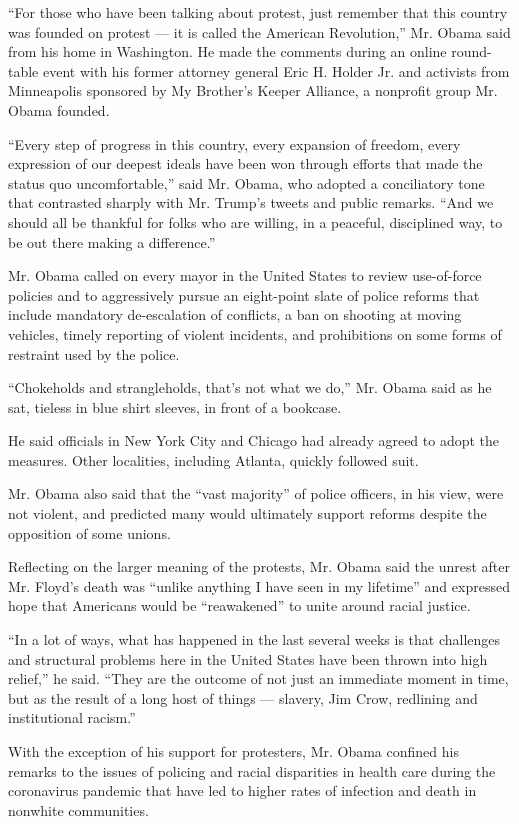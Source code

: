 ``For those who have been talking about protest, just remember that this
country was founded on protest --- it is called the American
Revolution,'' Mr. Obama said from his home in Washington. He made the
comments during an online round-table event with his former attorney
general Eric H. Holder Jr. and activists from Minneapolis sponsored by
My Brother's Keeper Alliance, a nonprofit group Mr. Obama founded.

``Every step of progress in this country, every expansion of freedom,
every expression of our deepest ideals have been won through efforts
that made the status quo uncomfortable,'' said Mr. Obama, who adopted a
conciliatory tone that contrasted sharply with Mr. Trump's tweets and
public remarks. ``And we should all be thankful for folks who are
willing, in a peaceful, disciplined way, to be out there making a
difference.''

Mr. Obama called on every mayor in the United States to review
use-of-force policies and to aggressively pursue an eight-point slate of
police reforms that include mandatory de-escalation of conflicts, a ban
on shooting at moving vehicles, timely reporting of violent incidents,
and prohibitions on some forms of restraint used by the police.

``Chokeholds and strangleholds, that's not what we do,'' Mr. Obama said
as he sat, tieless in blue shirt sleeves, in front of a bookcase.

He said officials in New York City and Chicago had already agreed to
adopt the measures. Other localities, including Atlanta, quickly
followed suit.

Mr. Obama also said that the ``vast majority'' of police officers, in
his view, were not violent, and predicted many would ultimately support
reforms despite the opposition of some unions.

Reflecting on the larger meaning of the protests, Mr. Obama said the
unrest after Mr. Floyd's death was ``unlike anything I have seen in my
lifetime'' and expressed hope that Americans would be ``reawakened'' to
unite around racial justice.

``In a lot of ways, what has happened in the last several weeks is that
challenges and structural problems here in the United States have been
thrown into high relief,'' he said. ``They are the outcome of not just
an immediate moment in time, but as the result of a long host of things
--- slavery, Jim Crow, redlining and institutional racism.''

With the exception of his support for protesters, Mr. Obama confined his
remarks to the issues of policing and racial disparities in health care
during the coronavirus pandemic that have led to higher rates of
infection and death in nonwhite communities.

